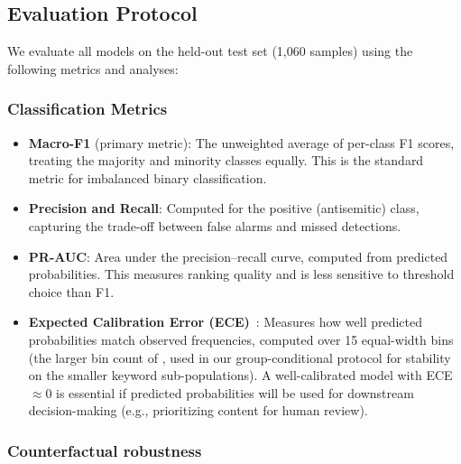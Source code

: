 \subsection{Evaluation Protocol}
\label{sec:eval_protocol}

We evaluate all models on the held-out test set (1,060 samples) using the following metrics and analyses:

\subsubsection{Classification Metrics}

\begin{itemize}[leftmargin=*,itemsep=1pt]
    \item \textbf{Macro-F1} (primary metric): The unweighted average of per-class F1 scores, treating the majority and minority classes equally. This is the standard metric for imbalanced binary classification.
    \item \textbf{Precision and Recall}: Computed for the positive (antisemitic) class, capturing the trade-off between false alarms and missed detections.
    \item \textbf{PR-AUC}: Area under the precision--recall curve, computed from predicted probabilities. This measures ranking quality and is less sensitive to threshold choice than F1.
    \item \textbf{Expected Calibration Error (ECE)}~\citep{guo2017calibration}: Measures how well predicted probabilities match observed frequencies, computed over 15 equal-width bins (the larger bin count of \citet{kumar2019verified}, used in our group-conditional protocol for stability on the smaller keyword sub-populations). A well-calibrated model with ECE $\approx 0$ is essential if predicted probabilities will be used for downstream decision-making (e.g., prioritizing content for human review).
\end{itemize}

\subsubsection{Counterfactual robustness}

